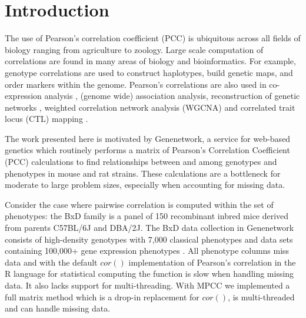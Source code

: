 \documentclass{bioinfo}
\begin{document}
\maketitle


\section{Introduction}

The use of Pearson's correlation coefficient (PCC) is ubiquitous
across all fields of biology ranging from agriculture to
zoology. Large scale computation of correlations are found in many
areas of biology and bioinformatics.  For example, genotype
correlations are used to construct haplotypes, build genetic maps, and
order markers within the genome. Pearson's correlations are also used
in co-expression analysis \citep{Tesson:2010}, (genome wide)
association analysis, reconstruction of genetic
networks \citep{Fukushima:2013}, weighted correlation network analysis
(WGCNA) \citep{Horvath:2008} and correlated trait locus (CTL)
mapping \citep{Arends2016a}.



\enlargethispage{12pt}

The work presented here is motivated by Genenetwork, a service for
web-based genetics \citep{Sloan2016} which routinely performs a matrix
of Pearson's Correlation Coefficient (PCC) calculations to find
relationships between and among genotypes and phenotypes in mouse and
rat strains. These calculations are a bottleneck for moderate to large
problem sizes, especially when accounting for missing data.

Consider the case where pairwise correlation is computed within the
set of phenotypes: the BxD family is a panel of 150 recombinant inbred
mice derived from parents C57BL/6J and DBA/2J. The BxD data collection
in Genenetwork consists of high-density genotypes with 7,000 classical
phenotypes and data sets containing 100,000+ gene expression
phenotypes \citep{Ashbrook:2019}.  All phenotype columns miss data and
with the default $cor()$ implementation of Pearson's correlation in
the R language for statistical computing \citep{R:2005} the function
is slow when handling missing data. It also lacks support for
multi-threading. With MPCC we implemented a full matrix method which
is a drop-in replacement for $cor()$, is multi-threaded and can handle
missing data.
\end{document}
